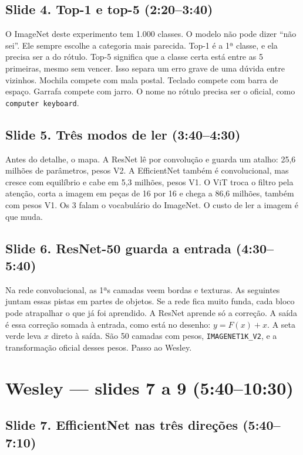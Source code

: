 \documentclass[12pt,a4paper]{article}
\begin{document}
\subsection*{Slide 4. Top-1 e top-5 (2:20--3:40)}

O ImageNet deste experimento tem 1.000 classes. O modelo não pode dizer ``não sei''. Ele sempre
escolhe a categoria mais parecida. Top-1 é a 1ª classe, e ela precisa ser a do rótulo. Top-5
significa que a classe certa está entre as 5 primeiras, mesmo sem vencer. Isso separa um erro
grave de uma dúvida entre vizinhos. Mochila compete com mala postal. Teclado compete com barra
de espaço. Garrafa compete com jarro. O nome no rótulo precisa ser o oficial, como
\texttt{computer keyboard}.

\subsection*{Slide 5. Três modos de ler (3:40--4:30)}

Antes do detalhe, o mapa. A ResNet lê por convolução e guarda um atalho: 25,6 milhões de
parâmetros, pesos V2. A EfficientNet também é convolucional, mas cresce com equilíbrio e cabe
em 5,3 milhões, pesos V1. O ViT troca o filtro pela atenção, corta a imagem em peças de 16 por
16 e chega a 86,6 milhões, também com pesos V1. Os 3 falam o vocabulário do ImageNet. O custo
de ler a imagem é que muda.

\subsection*{Slide 6. ResNet-50 guarda a entrada (4:30--5:40)}

Na rede convolucional, as 1ªs camadas veem bordas e texturas. As seguintes juntam essas pistas
em partes de objetos. Se a rede fica muito funda, cada bloco pode atrapalhar o que já foi
aprendido. A ResNet aprende só a correção. A saída é essa correção somada à entrada, como está
no desenho: \(y = F(x) + x\). A seta verde leva \(x\) direto à saída. São 50 camadas com pesos,
\texttt{IMAGENET1K\_V2}, e a transformação oficial desses pesos. Passo ao Wesley.

\section*{Wesley --- slides 7 a 9 (5:40--10:30)}

\subsection*{Slide 7. EfficientNet nas três direções (5:40--7:10)}
\end{document}
